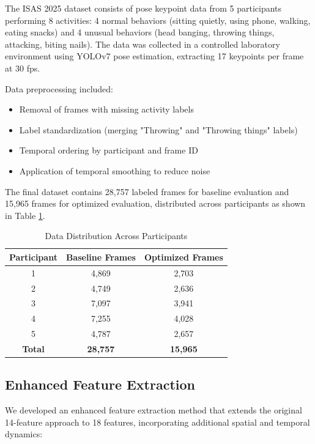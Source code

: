 \documentclass[a4paper,11pt]{article}
\begin{document}
The ISAS 2025 dataset consists of pose keypoint data from 5 participants performing 8 activities: 4 normal behaviors (sitting quietly, using phone, walking, eating snacks) and 4 unusual behaviors (head banging, throwing things, attacking, biting nails). The data was collected in a controlled laboratory environment using YOLOv7 pose estimation, extracting 17 keypoints per frame at 30 fps.

Data preprocessing included:
\begin{itemize}
\item Removal of frames with missing activity labels
\item Label standardization (merging "Throwing" and "Throwing things" labels)
\item Temporal ordering by participant and frame ID
\item Application of temporal smoothing to reduce noise
\end{itemize}

The final dataset contains 28,757 labeled frames for baseline evaluation and 15,965 frames for optimized evaluation, distributed across participants as shown in Table \ref{tab:data_distribution}.

\begin{table}[H]
\centering
\caption{Data Distribution Across Participants}
\label{tab:data_distribution}
\begin{tabular}{ccc}
\toprule
\textbf{Participant} & \textbf{Baseline Frames} & \textbf{Optimized Frames} \\
\midrule
1 & 4,869 & 2,703 \\
2 & 4,749 & 2,636 \\
3 & 7,097 & 3,941 \\
4 & 7,255 & 4,028 \\
5 & 4,787 & 2,657 \\
\midrule
\textbf{Total} & \textbf{28,757} & \textbf{15,965} \\
\bottomrule
\end{tabular}
\end{table}

\subsection{Enhanced Feature Extraction}

We developed an enhanced feature extraction method that extends the original 14-feature approach to 18 features, incorporating additional spatial and temporal dynamics:
\end{document}
